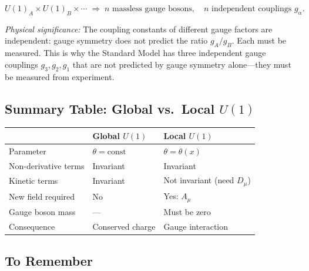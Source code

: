 \documentclass[../main.tex]{subfiles}
\begin{document}
\begin{equation}
  \boxed{
  U(1)_A\times U(1)_B\times\cdots
  \;\Longrightarrow\;
  n\text{ massless gauge bosons},\quad
  n\text{ independent couplings }g_\alpha.}
  \label{eq:lec10:product-gauge-count}
\end{equation}

\textit{Physical significance:} The coupling constants of different gauge factors are independent: gauge symmetry does not predict the ratio $g_A/g_B$.  Each must be measured.  This is why the Standard Model has three independent gauge couplings $g_3,g_2,g_1$ that are not predicted by gauge symmetry alone—they must be measured from experiment.

\subsection*{Summary Table: Global vs.\ Local $U(1)$}

\begin{center}
\begin{tabular}{lll}
\toprule
 & \textbf{Global $U(1)$} & \textbf{Local $U(1)$} \\
\midrule
Parameter & $\theta=\text{const}$ & $\theta=\theta(x)$ \\
Non-derivative terms & Invariant & Invariant \\
Kinetic terms & Invariant & Not invariant (need $D_\mu$) \\
New field required & No & Yes: $A_\mu$ \\
Gauge boson mass & --- & Must be zero \\
Consequence & Conserved charge & Gauge interaction \\
\bottomrule
\end{tabular}
\end{center}

\subsection*{To Remember}
\end{document}
